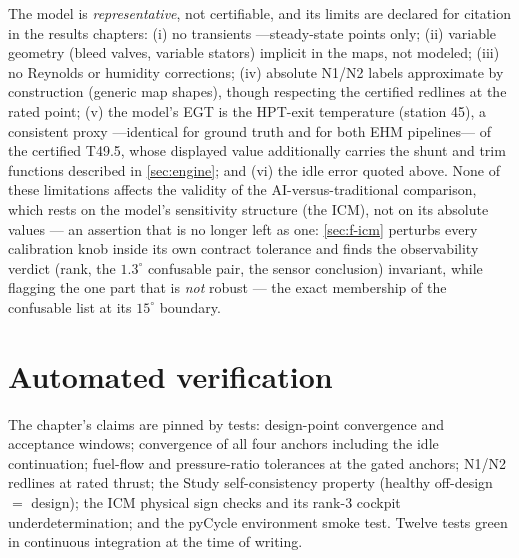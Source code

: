 The model is \emph{representative}, not certifiable, and its limits are declared for citation
in the results chapters: (i) no transients ---steady-state points only; (ii) variable geometry
(bleed valves, variable stators) implicit in the maps, not modeled; (iii) no Reynolds or
humidity corrections; (iv) absolute N1/N2 labels approximate by construction (generic map
shapes), though respecting the certified redlines at the rated point; (v) the model's EGT is
the HPT-exit temperature (station 45), a consistent proxy ---identical for ground truth and for
both EHM pipelines--- of the certified T49.5, whose displayed value additionally carries the
shunt and trim functions described in \cref{sec:engine}; and (vi) the idle error quoted above.
None of these limitations affects the validity of the AI-versus-traditional comparison, which
rests on the model's sensitivity structure (the ICM), not on its absolute values --- an
assertion that is no longer left as one: \cref{sec:f-icm} perturbs every calibration knob
inside its own contract tolerance and finds the observability verdict (rank, the
$1.3^{\circ}$ confusable pair, the sensor conclusion) invariant, while flagging the one part
that is \emph{not} robust --- the exact membership of the confusable list at its $15^{\circ}$
boundary.

\section{Automated verification}

The chapter's claims are pinned by tests: design-point convergence and acceptance windows;
convergence of all four anchors including the idle continuation; fuel-flow and pressure-ratio
tolerances at the gated anchors; N1/N2 redlines at rated thrust; the Study self-consistency
property (healthy off-design $=$ design); the ICM physical sign checks and its rank-3 cockpit
underdetermination; and the pyCycle environment smoke test. Twelve tests green in continuous
integration at the time of writing.
